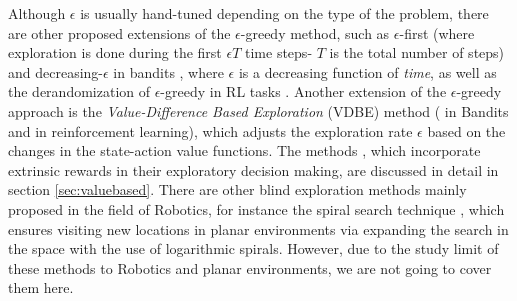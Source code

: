 Although $\epsilon$ is usually hand-tuned depending on the type of the problem, there are other proposed extensions of the $\epsilon$-greedy method, such as $\epsilon$-first  (where exploration is done during the first $\epsilon T$ time steps- $T$ is the total number of steps) and decreasing-$\epsilon$ in bandits , where $\epsilon$ is a decreasing function of \emph{time}, as well as the derandomization of $\epsilon$-greedy in RL tasks . Another extension of the $\epsilon$-greedy approach is the \emph{Value-Difference Based Exploration} (VDBE) method ( in Bandits and  in reinforcement learning), which adjusts the exploration rate $\epsilon$ based on the changes in the state-action value functions. The methods , which incorporate extrinsic rewards in their exploratory decision making, are discussed in detail in section \ref{sec:valuebased}. There are other blind exploration methods mainly proposed in the field of Robotics, for instance the spiral search technique , which ensures visiting new locations in planar environments via expanding the search in the space with the use of logarithmic spirals. However, due to the study limit of these methods to Robotics and planar environments, we are not going to cover them here.

